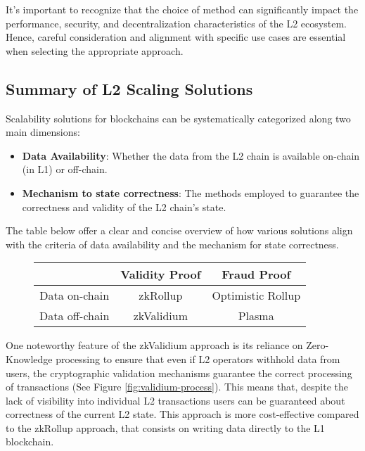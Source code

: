 It's important to recognize that the choice of method can significantly impact the performance, security, and decentralization characteristics of the L2 ecosystem. Hence, careful consideration and alignment with specific use cases are essential when selecting the appropriate approach.

\subsection{Summary of L2 Scaling Solutions}

Scalability solutions for blockchains can be systematically categorized along two main dimensions:

\begin{itemize}

\item \textbf{Data Availability}: Whether the data from the L2 chain is available on-chain (in L1) or off-chain.

\item \textbf{Mechanism to state correctness}: The methods employed to guarantee the correctness and validity of the L2 chain's state.

\end{itemize}

The table below offer a clear and concise overview of how various solutions align with the criteria of data availability and the mechanism for state correctness.

\begin{figure}[H]
\centering
\begin{tabular}{|c|c|c|}
\hline
\cellcolor{darkgray} & \cellcolor{darkgray} \color{white} Validity Proof  & \cellcolor{darkgray} \color{white} Fraud Proof \\ \hline
\cellcolor{lightgray} Data on-chain   & zkRollup       & Optimistic Rollup \\ \hline
\cellcolor{lightgray} Data off-chain  & zkValidium     & Plasma \\ \hline
\end{tabular}
\end{figure}


One noteworthy feature of the zkValidium approach is its reliance on Zero-Knowledge processing to ensure that even if L2 operators withhold data from users, the cryptographic validation mechanisms guarantee the correct processing of transactions (See Figure \ref{fig:validium-process}). This means that, despite the lack of visibility into individual L2 transactions users can be guaranteed about correctness of the current L2 state. This approach is more cost-effective compared to the zkRollup approach, that consists on writing data directly to the L1 blockchain.

